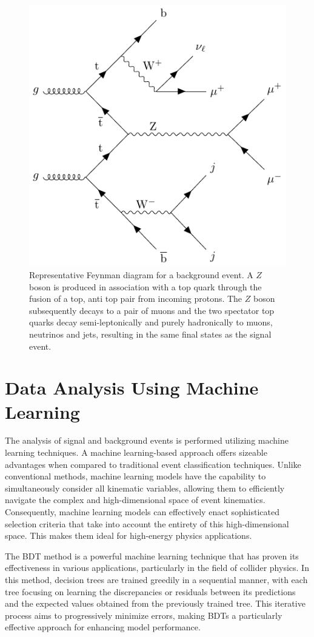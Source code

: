\begin{figure}[]
\centering
\includegraphics[width=.75\linewidth]{Images/bg_Z_full.pdf}
\caption{Representative Feynman diagram for a background event. A $Z$ boson is produced in association with a top quark through the fusion of a top, anti top pair from incoming protons. The $Z$ boson subsequently decays to a pair of muons and the two spectator top quarks decay semi-leptonically and purely hadronically to muons, neutrinos and jets, resulting in the same final states as the signal event.\label{fig:v}}
\end{figure}

\section{Data Analysis Using Machine Learning}\label{sec:ML}
The analysis of signal and background events is performed utilizing machine learning techniques. A machine learning-based approach offers sizeable advantages when compared to traditional event classification techniques. Unlike conventional methods, machine learning models have the capability to simultaneously consider all kinematic variables, allowing them to efficiently navigate the complex and high-dimensional space of event kinematics. Consequently, machine learning models can effectively enact sophisticated selection criteria that take into account the entirety of this high-dimensional space. This makes them ideal for high-energy physics applications.

The BDT method is a powerful machine learning technique that has proven its effectiveness in various applications, particularly in the field of collider physics. In this method, decision trees are trained greedily in a sequential manner, with each tree focusing on learning the discrepancies or residuals between its predictions and the expected values obtained from the previously trained tree. This iterative process aims to progressively minimize errors, making BDTs a particularly effective approach for enhancing model performance.

